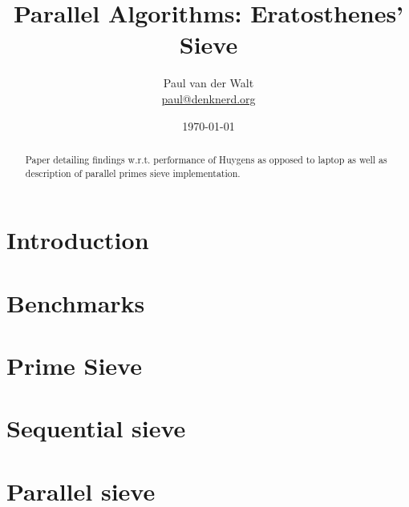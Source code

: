 \documentclass[a4paper]{article}
\author{Paul van der Walt\\\url{paul@denknerd.org}}
\date{\today}
\title{Parallel Algorithms: Eratosthenes' Sieve}
\begin{document}
\maketitle
\begin{abstract}
    Paper detailing findings w.r.t. performance of Huygens as opposed to laptop
    as well as description of parallel primes sieve implementation. 
\end{abstract}
\tableofcontents

\section{Introduction}

\section{Benchmarks}

\section{Prime Sieve}

\appendix
\section{Sequential sieve}

\section{Parallel sieve}
\end{document}
